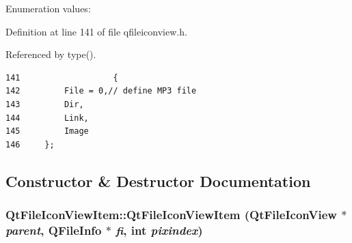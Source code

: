 \begin{Desc}
\item[Enumeration values: ]\par
\begin{description}
\item[{\em 
File\label{classQtFileIconViewItem_QtFileIconViewItemw4QtFileIconViewItemw0}
}]\item[{\em 
Dir\label{classQtFileIconViewItem_QtFileIconViewItemw4QtFileIconViewItemw1}
}]\item[{\em 
Link\label{classQtFileIconViewItem_QtFileIconViewItemw4QtFileIconViewItemw2}
}]\item[{\em 
Image\label{classQtFileIconViewItem_QtFileIconViewItemw4QtFileIconViewItemw3}
}]\end{description}
\end{Desc}



Definition at line 141 of file qfileiconview.h.

Referenced by type().



\footnotesize\begin{verbatim}141                   {
142         File = 0,// define MP3 file
143         Dir,
144         Link,
145         Image
146     };
\end{verbatim}\normalsize 


\subsection{Constructor \& Destructor Documentation}
\subsubsection{\setlength{\rightskip}{0pt plus 5cm}Qt\-File\-Icon\-View\-Item::Qt\-File\-Icon\-View\-Item ({\bf Qt\-File\-Icon\-View} $\ast$ {\em parent}, QFile\-Info $\ast$ {\em fi}, int {\em pixindex})}\label{classQtFileIconViewItem_QtFileIconViewItema0}




